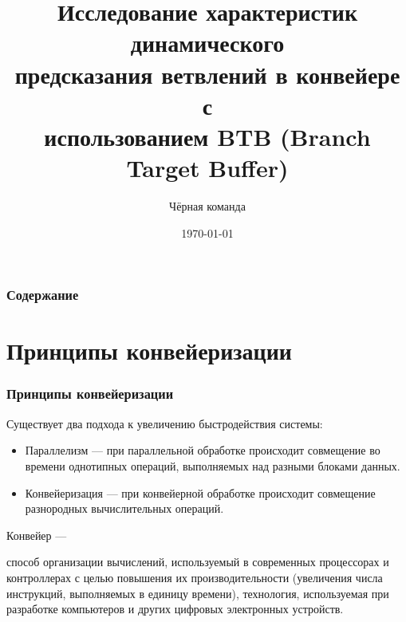 \documentclass{beamer}
\title[Branch Target Buffer]{Исследование характеристик динамического \\ предсказания ветвлений в конвейере с \\ использованием BTB (Branch Target Buffer)} %
\author{Чёрная команда} %
\institute[СПбПУ] %
{
Санкт-Петербургский политехнический университет Петра Великого \\ %
\medskip
\textit{Антон Абрамов <abramov91@mail.ru>\\
Владислав Бусаров <happyfanik@yandex.ru>\\
Сергей Дедков <dsv.mail@yandex.ru>\\
Семён Мартынов <semen.martynov@gmail.com>\\
Николай Патраков <noon.vlg@gmail.com>} %
}
\date{\today} %
\begin{document}
\begin{frame}
\titlepage %
\end{frame}

\begin{frame}
\frametitle{Содержание} %
\tableofcontents %
\end{frame}


\section{Принципы конвейеризации}

\begin{frame}
\frametitle{Принципы конвейеризации}

Существует два подхода к увеличению быстродействия системы:

\begin{itemize}
\item Параллелизм — при параллельной обработке происходит совмещение во времени однотипных операций, выполняемых над разными блоками данных.
\item Конвейеризация — при конвейерной обработке происходит совмещение разнородных вычислительных операций.
\end{itemize}

\begin{block}{Конвейер —}

способ организации вычислений, используемый в современных процессорах и контроллерах с целью повышения их производительности (увеличения числа инструкций, выполняемых в единицу времени), технология, используемая при разработке компьютеров и других цифровых электронных устройств.
\end{block}
 
\end{frame}
\end{document}
